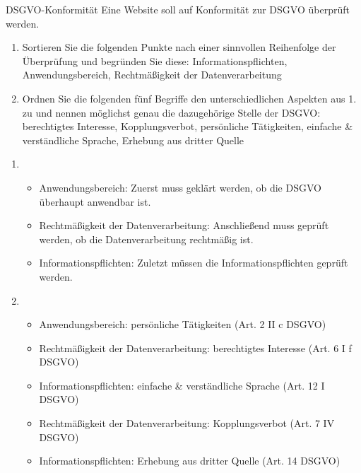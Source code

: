 \documentclass{article}
\begin{document}
\begin{exercise}{DSGVO-Konformität}
  Eine Website soll auf Konformität zur DSGVO überprüft werden.
  \begin{enumerate}
    \item Sortieren Sie die folgenden Punkte nach einer sinnvollen Reihenfolge der Überprüfung und begründen Sie diese: Informationspflichten, Anwendungsbereich, Rechtmäßigkeit der Datenverarbeitung
    \item Ordnen Sie die folgenden fünf Begriffe den unterschiedlichen Aspekten aus 1. zu und nennen möglichst genau die dazugehörige Stelle der DSGVO: berechtigtes Interesse, Kopplungsverbot, persönliche Tätigkeiten, einfache \& verständliche Sprache, Erhebung aus dritter Quelle
  \end{enumerate}

  \begin{solution}
    \begin{enumerate}
      \item
            \begin{itemize}
              \item Anwendungsbereich: Zuerst muss geklärt werden, ob die DSGVO überhaupt anwendbar ist.
              \item Rechtmäßigkeit der Datenverarbeitung: Anschließend muss geprüft werden, ob die Datenverarbeitung rechtmäßig ist.
              \item Informationspflichten: Zuletzt müssen die Informationspflichten geprüft werden.
            \end{itemize}
      \item
            \begin{itemize}
              \item Anwendungsbereich: persönliche Tätigkeiten (Art. 2 II c DSGVO)
              \item Rechtmäßigkeit der Datenverarbeitung: berechtigtes Interesse (Art. 6 I f DSGVO)
              \item Informationspflichten: einfache \& verständliche Sprache (Art. 12 I DSGVO)
              \item Rechtmäßigkeit der Datenverarbeitung: Kopplungsverbot (Art. 7 IV DSGVO)
              \item Informationspflichten: Erhebung aus dritter Quelle (Art. 14 DSGVO)
            \end{itemize}
    \end{enumerate}
  \end{solution}
\end{exercise}
\end{document}
